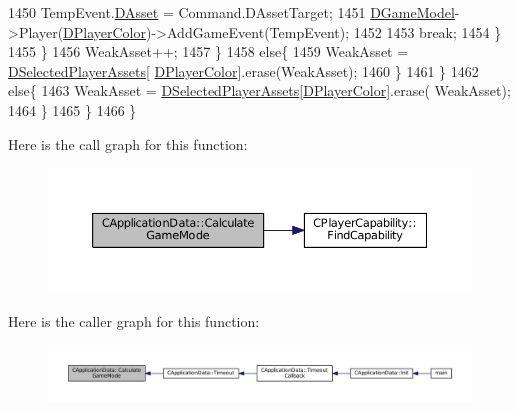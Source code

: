 \begin{DoxyCode}
1450                         TempEvent.\hyperlink{structSGameEvent_a40c85eeac83b96887b7449c9bdc5d624}{DAsset} = Command.DAssetTarget;
1451                         \hyperlink{classCApplicationData_a32b50c7c1cbac3cfd67c7f775b1d6fee}{DGameModel}->Player(\hyperlink{classCApplicationData_a53550939b20cba70570f113e4d1c5d02}{DPlayerColor})->AddGameEvent(TempEvent);
1452                                 
1453                         \textcolor{keywordflow}{break};
1454                     \}
1455                 \}
1456                 WeakAsset++;
1457             \}
1458             \textcolor{keywordflow}{else}\{
1459                 WeakAsset = \hyperlink{classCApplicationData_a05c1087d5a5c4ddc14fcb37444f1642b}{DSelectedPlayerAssets}[
      \hyperlink{classCApplicationData_a53550939b20cba70570f113e4d1c5d02}{DPlayerColor}].erase(WeakAsset);   
1460             \}
1461         \}
1462         \textcolor{keywordflow}{else}\{
1463             WeakAsset = \hyperlink{classCApplicationData_a05c1087d5a5c4ddc14fcb37444f1642b}{DSelectedPlayerAssets}[\hyperlink{classCApplicationData_a53550939b20cba70570f113e4d1c5d02}{DPlayerColor}].erase(
      WeakAsset);   
1464         \}
1465     \}
1466 \}
\end{DoxyCode}
Here is the call graph for this function\+:\nopagebreak
\begin{figure}[H]
\begin{center}
\leavevmode
\includegraphics[width=350pt]{classCApplicationData_a782d7204356ef9560deedd54320d4f16_cgraph}
\end{center}
\end{figure}
Here is the caller graph for this function\+:\nopagebreak
\begin{figure}[H]
\begin{center}
\leavevmode
\includegraphics[width=350pt]{classCApplicationData_a782d7204356ef9560deedd54320d4f16_icgraph}
\end{center}
\end{figure}
\hypertarget{classCApplicationData_a3c481d6483d165488596144a4bcf95cf}{}\label{classCApplicationData_a3c481d6483d165488596144a4bcf95cf} 
